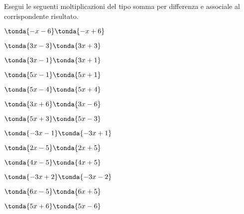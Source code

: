 \begin{esercizio}
\label{ese:11.17}
Esegui le seguenti moltiplicazioni del tipo somma per differenza
e associale al corrispondente risultato.

\vspace{-.5em}
\begin{htmulticols}{3}
\begin{enumeratea}
\spazielenx
\item \(\tonda{- x - 6}\tonda{- x + 6}\) %
\item \(\tonda{3 x - 3}\tonda{3 x + 3}\) %
\item \(\tonda{3 x - 1}\tonda{3 x + 1}\) %
\item \(\tonda{5 x - 1}\tonda{5 x + 1}\) %
\item \(\tonda{5 x - 4}\tonda{5 x + 4}\) %
\item \(\tonda{3 x + 6}\tonda{3 x - 6}\) %
\item \(\tonda{5 x + 3}\tonda{5 x - 3}\) %
\item \(\tonda{- 3 x - 1}\tonda{- 3 x + 1}\) %
\item \(\tonda{2 x - 5}\tonda{2 x + 5}\) %
\item \(\tonda{4 x - 5}\tonda{4 x + 5}\) %
\item \(\tonda{- 3 x + 2}\tonda{- 3 x - 2}\) %
\item \(\tonda{6 x - 5}\tonda{6 x + 5}\) %
\item \(\tonda{5 x + 6}\tonda{5 x - 6}\) %

\end{enumeratea}
\end{htmulticols}
\end{esercizio}
